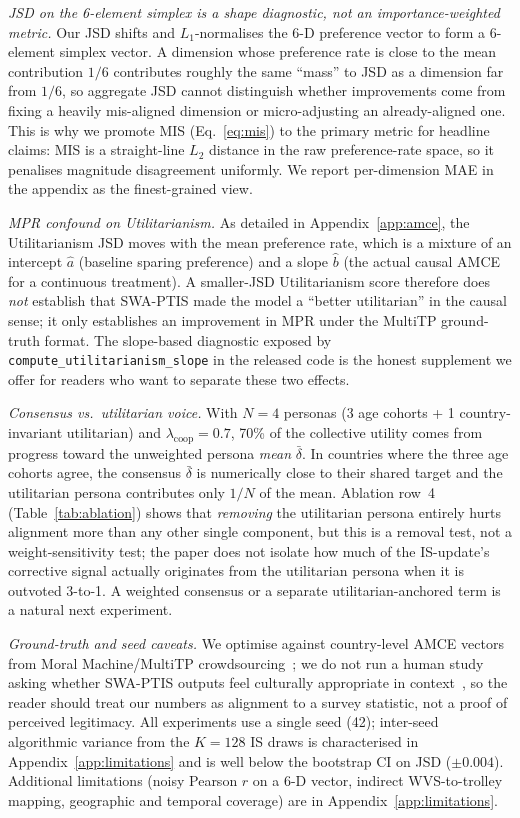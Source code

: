 \documentclass{article}
\begin{document}
\emph{JSD on the 6-element simplex is a shape diagnostic, not an
importance-weighted metric.} Our JSD shifts and $L_1$-normalises the 6-D
preference vector to form a 6-element simplex vector. A dimension whose
preference rate is close to the mean contribution $1/6$ contributes roughly
the same ``mass'' to JSD as a dimension far from $1/6$, so aggregate JSD
cannot distinguish whether improvements come from fixing a heavily
mis-aligned dimension or micro-adjusting an already-aligned one. This is why
we promote MIS (Eq.~\ref{eq:mis}) to the primary metric for headline claims:
MIS is a straight-line $L_2$ distance in the raw preference-rate space, so it
penalises magnitude disagreement uniformly. We report per-dimension MAE in the
appendix as the finest-grained view.

\emph{MPR confound on Utilitarianism.} As detailed in Appendix~\ref{app:amce},
the Utilitarianism JSD moves with the mean preference rate, which is a mixture
of an intercept $\hat{a}$ (baseline sparing preference) and a slope $\hat{b}$
(the actual causal AMCE for a continuous treatment). A smaller-JSD Utilitarianism
score therefore does \emph{not} establish that SWA-PTIS made the model a
``better utilitarian'' in the causal sense; it only establishes an improvement
in MPR under the MultiTP ground-truth format. The slope-based diagnostic
exposed by \texttt{compute\_utilitarianism\_slope} in the released code is the
honest supplement we offer for readers who want to separate these two effects.

\emph{Consensus vs.\ utilitarian voice.} With $N{=}4$ personas (3 age cohorts
+ 1 country-invariant utilitarian) and $\lambda_{\text{coop}}{=}0.7$, 70\% of
the collective utility comes from progress toward the unweighted persona
\emph{mean} $\bar{\delta}$. In countries where the three age cohorts agree,
the consensus $\bar{\delta}$ is numerically close to their shared target and
the utilitarian persona contributes only $1/N$ of the mean. Ablation row~4
(Table~\ref{tab:ablation}) shows that \emph{removing} the utilitarian persona
entirely hurts alignment more than any other single component, but this is a
removal test, not a weight-sensitivity test; the paper does not isolate how
much of the IS-update's corrective signal actually originates from the
utilitarian persona when it is outvoted 3-to-1. A weighted consensus or a
separate utilitarian-anchored term is a natural next experiment.

\emph{Ground-truth and seed caveats.} We optimise against country-level AMCE
vectors from Moral Machine/MultiTP crowdsourcing~\citep{awad2018moral,jin2025multitp};
we do not run a human study asking whether SWA-PTIS outputs feel culturally
appropriate in context~\citep{atari2023humans}, so the reader should treat our
numbers as alignment to a survey statistic, not a proof of perceived
legitimacy. All experiments use a single seed (42); inter-seed algorithmic
variance from the $K{=}128$ IS draws is characterised in
Appendix~\ref{app:limitations} and is well below the bootstrap CI on JSD
($\pm 0.004$). Additional limitations (noisy Pearson $r$ on a 6-D vector,
indirect WVS-to-trolley mapping, geographic and temporal coverage) are in
Appendix~\ref{app:limitations}.
\end{document}
